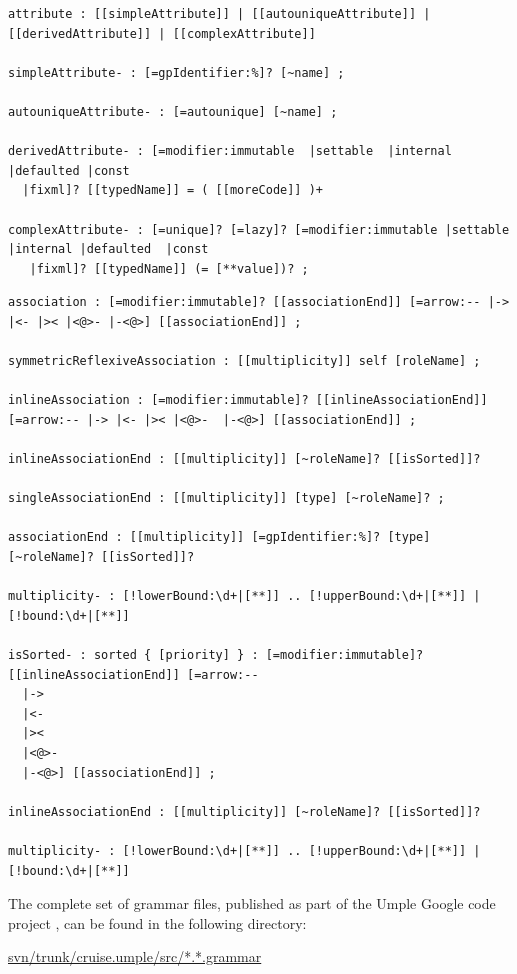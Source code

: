\begin{lstlisting}[style=umplePlain, label=lst:fullGrammar2,caption=Umple Grammar for attributes]
attribute : [[simpleAttribute]] | [[autouniqueAttribute]] | [[derivedAttribute]] | [[complexAttribute]]

simpleAttribute- : [=gpIdentifier:%]? [~name] ;

autouniqueAttribute- : [=autounique] [~name] ;

derivedAttribute- : [=modifier:immutable  |settable  |internal |defaulted |const 
  |fixml]? [[typedName]] = ( [[moreCode]] )+

complexAttribute- : [=unique]? [=lazy]? [=modifier:immutable |settable |internal |defaulted  |const 
   |fixml]? [[typedName]] (= [**value])? ;
\end{lstlisting}

\begin{lstlisting}[style=umplePlain, label=lst:fullGrammar3,caption=Umple Grammar for associations]
association : [=modifier:immutable]? [[associationEnd]] [=arrow:-- |-> |<- |>< |<@>- |-<@>] [[associationEnd]] ;

symmetricReflexiveAssociation : [[multiplicity]] self [roleName] ;

inlineAssociation : [=modifier:immutable]? [[inlineAssociationEnd]] [=arrow:-- |-> |<- |>< |<@>-  |-<@>] [[associationEnd]] ;

inlineAssociationEnd : [[multiplicity]] [~roleName]? [[isSorted]]?

singleAssociationEnd : [[multiplicity]] [type] [~roleName]? ;

associationEnd : [[multiplicity]] [=gpIdentifier:%]? [type] [~roleName]? [[isSorted]]?

multiplicity- : [!lowerBound:\d+|[**]] .. [!upperBound:\d+|[**]] | [!bound:\d+|[**]]

isSorted- : sorted { [priority] } : [=modifier:immutable]? [[inlineAssociationEnd]] [=arrow:-- 
  |-> 
  |<- 
  |>< 
  |<@>- 
  |-<@>] [[associationEnd]] ;

inlineAssociationEnd : [[multiplicity]] [~roleName]? [[isSorted]]?

multiplicity- : [!lowerBound:\d+|[**]] .. [!upperBound:\d+|[**]] | [!bound:\d+|[**]]
\end{lstlisting}

The complete set of grammar files, published as part of the Umple Google code project \cite{umpleRepository}, can be found in the following directory:

\url{svn/trunk/cruise.umple/src/*.*.grammar}

